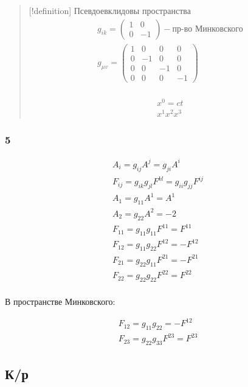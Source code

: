 \begin{quote}
{[}!definition{]} Псевдоевклидовы пространства $$\begin{gather}
g_{ik} = \begin{pmatrix}
1 & 0 \\
0 & -1
\end{pmatrix} - \text{пр-во Минковского} \\
g_{\mu v} = \begin{pmatrix}
1 & 0 & 0 & 0 \\
0 & -1 & 0 & 0 \\
0 & 0 & -1 & 0 \\
0 & 0 & 0 & -1
\end{pmatrix} \\
\end{gather}$$

$$\begin{gather}
x^{0} = ct \\
x^{1}
x^{2}
x^{3}
\end{gather}$$
\end{quote}

\subsubsection{5}

$$\begin{gather}
A_{i} = g_{ij}A^{j} = g_{ji}A^{i} \\
F_{ij} = g_{ik}g_{jl}F^{kl} = g_{ii}g_{jj} F^{ij} \\
A_{1} = g_{11}A^{1} = A^{1} \\
A_{2} = g_{22}A^{2} = -2 \\
F_{11} = g_{11}g_{11}F^{11} = F^{11} \\
F_{12} = g_{11}g_{22}F^{12} = -F^{12} \\
F_{21} = g_{22}g_{11}F^{21} = -F^{21} \\
F_{22} = g_{22}g_{22}F^{22} = F^{22} \\
\end{gather}$$

В пространстве Минковского:

$$\begin{gather}
F_{12} = g_{11}g_{22} = -F^{12} \\
F_{23} = g_{22}g_{33}F^{23} = F^{23}
\end{gather}$$

\subsection{К/р}


